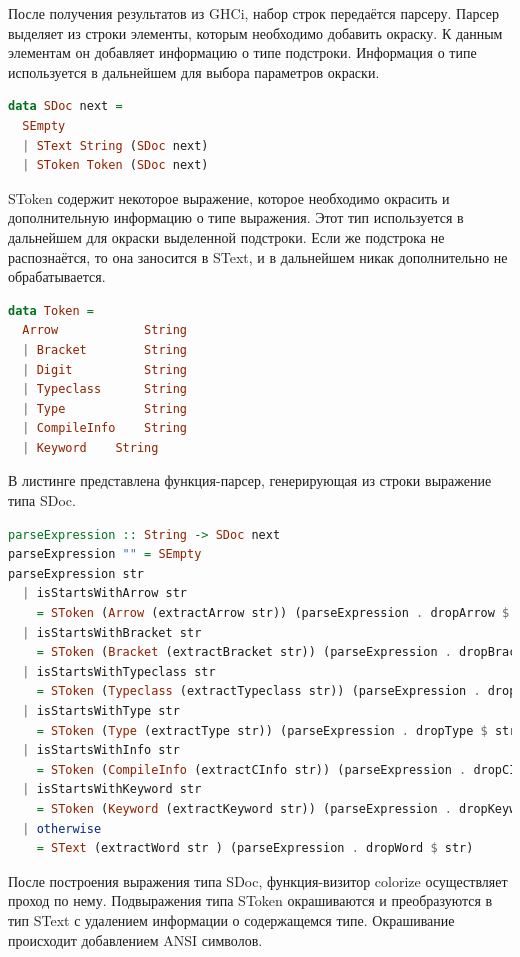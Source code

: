 После получения результатов из GHCi, набор строк передаётся парсеру. Парсер выделяет из строки элементы, которым необходимо добавить окраску. К данным элементам он добавляет информацию о типе подстроки. Информация о типе используется в дальнейшем для выбора параметров окраски.

\begin{lstlisting}[language=Haskell]
data SDoc next =
  SEmpty
  | SText String (SDoc next)
  | SToken Token (SDoc next)
\end{lstlisting}

SToken содержит некоторое выражение, которое необходимо окрасить и дополнительную информацию о типе выражения. Этот тип используется в дальнейшем для окраски выделенной подстроки. Если же подстрока не распознаётся, то она заносится в SText, и в дальнейшем никак дополнительно не обрабатывается.

\begin{lstlisting}[language=Haskell]
data Token =
  Arrow            String
  | Bracket        String
  | Digit          String
  | Typeclass      String
  | Type           String
  | CompileInfo    String 
  | Keyword	   String
\end{lstlisting}

В листинге представлена функция-парсер, генерирующая из строки выражение типа SDoc.

\begin{lstlisting}[language=Haskell, caption = Функция парсинга выражения]
parseExpression :: String -> SDoc next
parseExpression "" = SEmpty
parseExpression str
  | isStartsWithArrow str
    = SToken (Arrow (extractArrow str)) (parseExpression . dropArrow $ str)
  | isStartsWithBracket str
    = SToken (Bracket (extractBracket str)) (parseExpression . dropBracket $ str)
  | isStartsWithTypeclass str
    = SToken (Typeclass (extractTypeclass str)) (parseExpression . dropTypeclass $ str)
  | isStartsWithType str
    = SToken (Type (extractType str)) (parseExpression . dropType $ str)
  | isStartsWithInfo str
    = SToken (CompileInfo (extractCInfo str)) (parseExpression . dropCInfo $ str)
  | isStartsWithKeyword str
    = SToken (Keyword (extractKeyword str)) (parseExpression . dropKeyword $ str)
  | otherwise
    = SText (extractWord str ) (parseExpression . dropWord $ str)
\end{lstlisting}

После построения выражения типа SDoc, функция-визитор colorize осуществляет проход по нему. Подвыражения типа SToken окрашиваются и преобразуются в тип SText с удалением информации о содержащемся типе. Окрашивание происходит добавлением ANSI символов.

